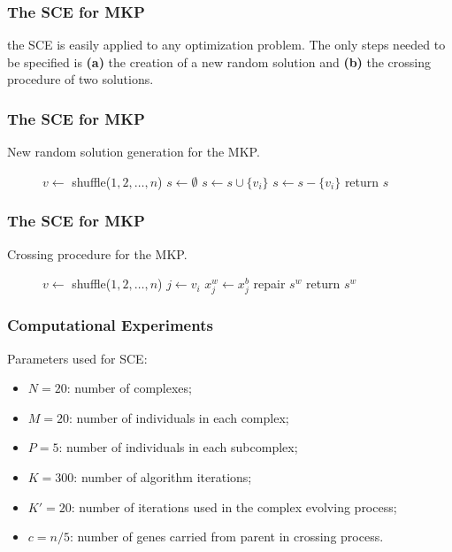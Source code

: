 \begin{frame}
\frametitle{The SCE for MKP}
the SCE is easily applied to any
optimization problem.
The only steps needed to be specified is \textbf{(a)} the creation of a new random
solution and \textbf{(b)} the crossing procedure of two solutions.
\end{frame}

\begin{frame}
\frametitle{The SCE for MKP}
New random solution generation for the MKP.
\begin{figure}
\begin{algorithmic}[1]
   \pause
    \State $v \leftarrow $ shuffle($1, 2, \ldots, n$) \pause
	\State $s \leftarrow \emptyset$ \pause
	  \State $s \leftarrow s \cup \{v_i\}$ \pause
	   \pause
	    \State $s \leftarrow s - \{v_i\}$
      \EndIf  \pause
	\EndFor
  \State return $s$
  \EndFunction
\end{algorithmic}
\end{figure}
\end{frame}

\begin{frame}
\frametitle{The SCE for MKP}
Crossing procedure for the MKP.
\begin{figure}
\begin{algorithmic}[1]
   \pause
    \State $v \leftarrow $ shuffle($1, 2, \ldots, n$) \pause
	  \State $j \leftarrow v_i$ \pause
	  \State $x^w_j \leftarrow x^b_j$
	\EndFor \pause
	  \State repair $s^w$
	\EndIf \pause
  \State return $s^w$
  \EndFunction
\end{algorithmic}
\end{figure}
\end{frame}


\begin{frame}
\frametitle{Computational Experiments}
Parameters used for SCE:
\begin{itemize}
  \item $N = 20$: number of complexes;
  \item $M = 20$: number of individuals in each complex;
  \item $P = 5$: number of individuals in each subcomplex;
  \item $K = 300$: number of algorithm iterations;
  \item $K' = 20$: number of iterations used in the complex evolving process;
  \item $c = n/5$: number of genes carried from parent in crossing process.
\end{itemize}
\end{frame}

